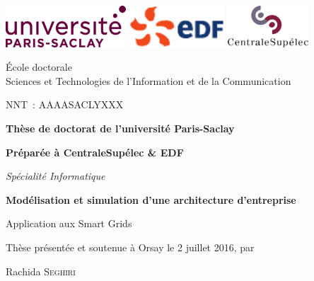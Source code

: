 \begin{titlepage}
\vspace*{-2cm}
\includegraphics[height=1.55cm]{logo/ParisSaclay}\hfill
\includegraphics[height=1.55cm]{logo/Logo_EDF}\hfill
\includegraphics[height=1.55cm]{logo/CentraleSupelec}

\hrulefill

\begin{minipage}[t]{0.6\textwidth}
    {\small
        École doctorale \\
        Sciences et Technologies de l'Information et de la Communication\\
    }
\end{minipage}
\hfill
\begin{minipage}[t]{0.3\textwidth}
    NNT~: AAAASACLYXXX
\end{minipage}

\bigskip
\bigskip

\begin{center}
{\large\bfseries Thèse de doctorat de l'université Paris-Saclay}

{\large\bfseries Préparée à CentraleSupélec \& EDF}

{\large \textit{Spécialité Informatique}}

\vfill

{\LARGE\bfseries
    Modélisation et simulation d'une architecture d'entreprise
    
    Application aux Smart Grids
}

\vfill

{\large Thèse présentée et soutenue à Orsay le 2 juillet 2016, par}


\bigskip

{\Large Rachida \textsc{Seghiri}}

\end{center}
\vfill


\end{titlepage}
